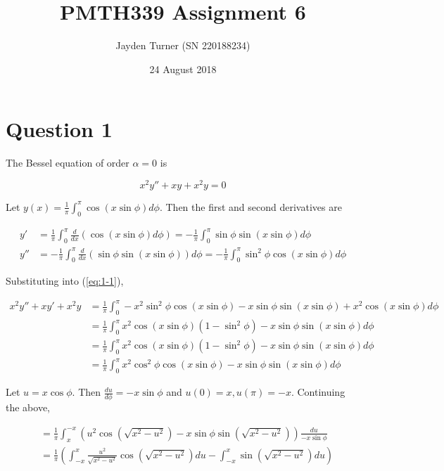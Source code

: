\documentclass{article}
\title{PMTH339 Assignment 6}
\date{24 August 2018}
\author{Jayden Turner (SN 220188234)}
\begin{document}
\maketitle
{}

\section*{Question 1}

The Bessel equation of order $\alpha = 0$ is

\begin{equation} \label{eq:1-1}
    x^2y'' + xy + x^2y = 0
\end{equation}

Let $y(x) = \frac{1}{\pi} \int_0^\pi \cos(x\sin\phi)d\phi$. Then the first and second derivatives
are

\begin{align*}
    y' &= \frac{1}{\pi}\int_0^\pi \frac{d}{dx}(\cos(x\sin\phi)d\phi)
        = -\frac{1}{\pi}\int_0^\pi\sin\phi\sin(x\sin\phi)d\phi\\
    y'' &= -\frac{1}{\pi}\int_0^\pi \frac{d}{dx}(\sin\phi\sin(x\sin\phi)) d\phi
        = -\frac{1}{\pi}\int_0^\pi \sin^2\phi\cos(x\sin\phi)d\phi
\end{align*}

Substituting into (\ref{eq:1-1}),

\begin{align*}
    x^2y'' + xy' + x^2y
    &= \frac{1}{\pi}\int_0^\pi -x^2\sin^2\phi\cos(x\sin\phi)
        - x\sin\phi\sin(x\sin\phi) + x^2\cos(x\sin\phi) d\phi\\
    &= \frac{1}{\pi}\int_0^\pi x^2\cos(x\sin\phi)(1 - \sin^2\phi)
        - x\sin\phi\sin(x\sin\phi) d\phi\\
    &= \frac{1}{\pi}\int_0^{\pi} x^2\cos(x\sin\phi)(1 - \sin^2\phi)
    - x\sin\phi\sin(x\sin\phi) d\phi\\
    &= \frac{1}{\pi}\int_0^\pi x^2\cos^2\phi\cos(x\sin\phi) - x\sin\phi\sin(x\sin\phi) d\phi
\end{align*}

Let $u = x\cos\phi$. Then $\frac{du}{d\phi} = -x\sin\phi$ and $u(0) = x, u(\pi) = -x$.
Continuing the above,

\begin{align*}
    &= \frac{1}{\pi}\int_{x}^{-x} (u^2\cos(\sqrt{x^2 - u^2}) - x\sin\phi\sin(\sqrt{x^2 - u^2})) \frac{du}{-x\sin\phi}\\
    &= \frac{1}{\pi}\left(\int_{-x}^x \frac{u^2}{\sqrt{x^2 - u^2}}\cos(\sqrt{x^2 - u^2}) du
        - \int_{-x}^x\sin(\sqrt{x^2 - u^2}) du\right)
\end{align*}
\end{document}
